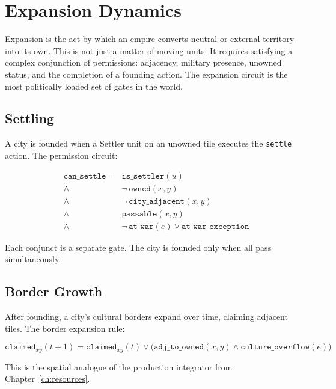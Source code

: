 \documentclass[11pt,a4paper,openany]{book}
\theoremstyle{plain}
\theoremstyle{definition}
\theoremstyle{remark}
\newenvironment{background}{%
  \begin{mdframed}[
    linecolor=sphereblue!40, backgroundcolor=sphereblue!5,
    linewidth=1pt, innertopmargin=8pt, innerbottommargin=8pt,
    innerleftmargin=10pt, innerrightmargin=10pt,
    skipabove=10pt, skipbelow=6pt
  ]%
  \setlength{\parindent}{0pt}%
  \noindent{\textcolor{sphereblue}{\textbf{Background}}}\par\smallskip\ignorespaces
}{\end{mdframed}}
\newcommand{\AND}{\ensuremath{\wedge}}
\newcommand{\OR}{\ensuremath{\vee}}
\newcommand{\NOT}{\ensuremath{\neg}}
\begin{document}
\chapter{Expansion Dynamics}
\label{ch:expansion}

\begin{background}
  Expansion is the act by which an empire converts neutral or external
  territory into its own. This is not just a matter of moving units.
  It requires satisfying a complex conjunction of permissions: adjacency,
  military presence, unowned status, and the completion of a founding action.
  The expansion circuit is the most politically loaded set of gates in
  the world.
\end{background}

\section{Settling}

A city is founded when a Settler unit on an unowned tile executes the
\texttt{settle} action. The permission circuit:

\begin{align*}
  \texttt{can\_settle} = &\; \texttt{is\_settler}(u) \\
  \AND &\; \NOT\,\texttt{owned}(x,y) \\
  \AND &\; \NOT\,\texttt{city\_adjacent}(x,y) \\
  \AND &\; \texttt{passable}(x,y) \\
  \AND &\; \NOT\,\texttt{at\_war}(e) \OR \texttt{at\_war\_exception}
\end{align*}

Each conjunct is a separate gate. The city is founded only when all
pass simultaneously.

\section{Border Growth}

After founding, a city's cultural borders expand over time, claiming
adjacent tiles. The border expansion rule:

\[
  \texttt{claimed}_{xy}(t+1) = \texttt{claimed}_{xy}(t) \OR
  \bigl(\texttt{adj\_to\_owned}(x,y) \AND \texttt{culture\_overflow}(e)\bigr)
\]

This is the spatial analogue of the production integrator from
Chapter~\ref{ch:resources}.
\end{document}
